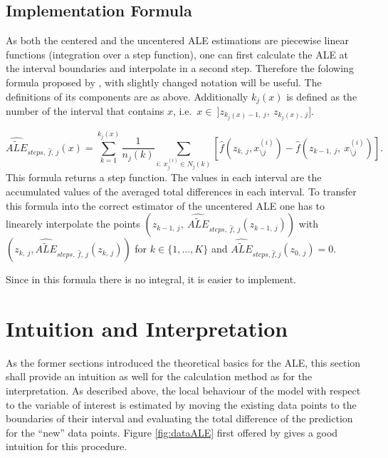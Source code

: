 \documentclass[
]{krantz}
\begin{document}
\hypertarget{implementation-formula}{%
\subsection{Implementation Formula}\label{implementation-formula}}

As both the centered and the uncentered ALE estimations are piecewise linear functions (integration over a step function), one can first calculate the ALE at the interval boundaries and interpolate in a second step. Therefore the folowing formula proposed by \citep[page 11]{Apley2016} , with slightly changed notation will be useful. The definitions of its components are as above. Additionally \(k_j(x)\) is defined as the number of the interval that contains \(x\), i.e.~\(x \in ~]z_{k_j(x)-1,~j},~z_{k_j(x),~j}]\).

\[  \widehat{\widetilde{ALE}}_{steps,~\hat{f},~j}(x) =  \sum_{k=1}^{k_j(x)}   \frac{1}{n_j(k)}\sum_{i:~x_j^{(i)}\in N_j(k)} [\hat{f}(z_{k,~j}, x_{\setminus j}^{(i)})-\hat{f}(z_{k-1,~j},~x_{\setminus j}^{(i)})].  \]
This formula returns a step function. The values in each interval are the accumulated values of the averaged total differences in each interval. To transfer this formula into the correct estimator of the uncentered ALE one has to linearely interpolate the points \((z_{k-1,~j},~\widehat{\widetilde{ALE}}_{steps,~\hat{f},~j}(z_{k-1,~j}))\) with \(( z_{k,~j},\widehat{\widetilde{ALE}}_{steps,~ \hat{f},~j}(z_{k,~j}))\) for \(k \in \{1, ..., K \}\) and \(\widehat{\widetilde{ALE}}_{steps, \hat{f},j}(z_{0,~j}) = 0\).

Since in this formula there is no integral, it is easier to implement.

\hypertarget{intuition-and-interpretation}{%
\section{Intuition and Interpretation}\label{intuition-and-interpretation}}

As the former sections introduced the theoretical basics for the ALE, this section shall provide an intuition as well for the calculation method as for the interpretation. As described above, the local behaviour of the model with respect to the variable of interest is estimated by moving the existing data points to the boundaries of their interval and evaluating the total difference of the prediction for the ``new'' data points. Figure \ref{fig:dataALE} first offered by \citep{molnar2019} gives a good intuition for this procedure.
\end{document}
